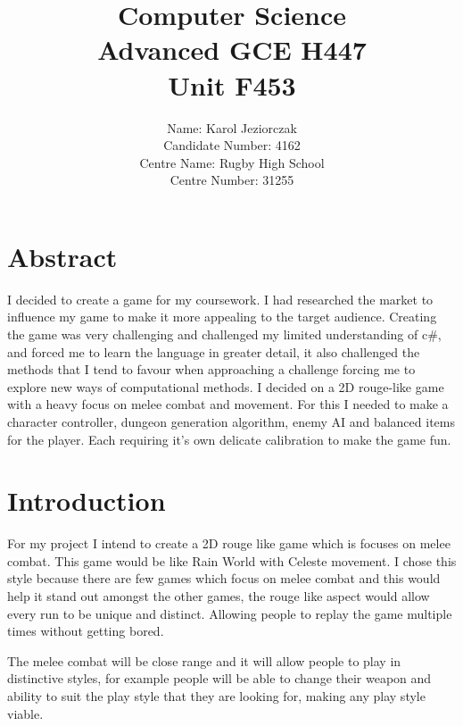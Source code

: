 \documentclass{article}
\newcommand{\parBr}{\vspace{5mm}}%
\begin{document}
\title{Computer Science \\ Advanced GCE H447 \\ Unit F453 \\[2\baselineskip]}
\author{\large Name: Karol Jeziorczak \\ Candidate Number: 4162 \\ Centre Name: Rugby High School \\ Centre Number: 31255 }
\date{}
\maketitle
\newpage
\tableofcontents
\newpage
\listoffigures
\newpage

\section{Abstract}
I decided to create a game for my coursework. I had researched the market to influence my game to make it more appealing to the target audience. Creating the game was very challenging and challenged my  limited understanding of c\#, and forced me to learn the language in greater detail, it also challenged the methods that I tend to favour when approaching a challenge forcing me to explore new ways of computational methods. I decided on a 2D rouge-like game with a heavy focus on melee combat and movement. For this I needed to make a character controller, dungeon generation algorithm, enemy AI and balanced items for the player. Each requiring it's own delicate calibration to make the game fun. 

\section{Introduction}
For my project I intend to create a 2D rouge like game which is focuses on melee combat. This game would be like Rain World with Celeste movement. I chose this style because there are few games which focus on melee combat and this would help it stand out amongst the other games, the rouge like aspect would allow every run to be unique and distinct. Allowing people to replay the game multiple times without getting bored.

\parBr

The melee combat will be close range and it will allow people to play in distinctive styles, for example people will be able to change their weapon and ability to suit the play style that they are looking for, making any play style viable.
\end{document}
